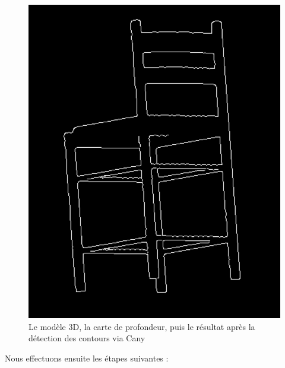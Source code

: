 \documentclass[12pt, a4paper, oneside]{article}
\begin{document}
\begin{figure}
\begin{center}
        \includegraphics[scale=0.41]{images/chaise-cany.png}
        \caption{Le modèle 3D, la carte de profondeur, puis le résultat après la détection des contours via Cany}
        \label{img:generer-vues}
    \end{center}
\end{figure}

Nous effectuons ensuite les étapes suivantes :
\end{document}
